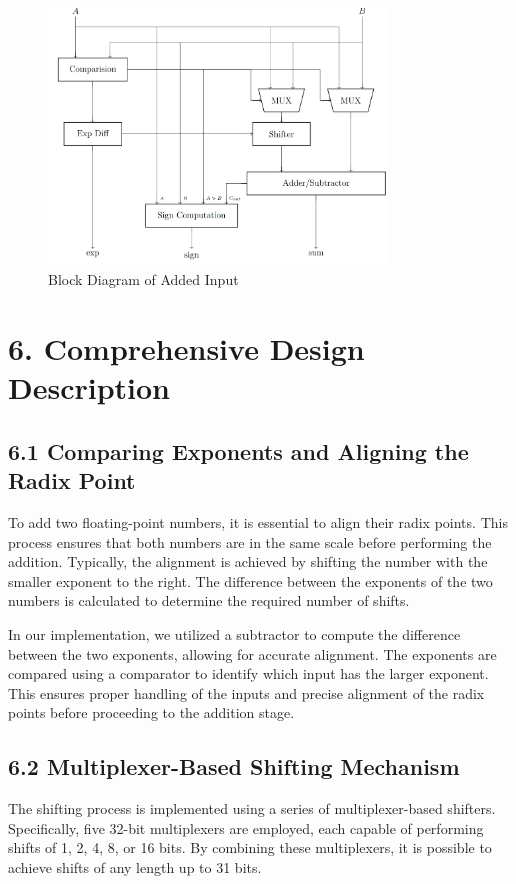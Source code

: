 \documentclass{article}
\begin{document}
\begin{figure}[H]
    \centering
    \includegraphics[width=0.8\textwidth]{blockadder.png} %
    \caption{Block Diagram of Added Input}
    \label{fig:Output Processor of the Resul}
\end{figure}



\section*{6. Comprehensive Design Description}

\subsection*{6.1 Comparing Exponents and Aligning the Radix Point}

To add two floating-point numbers, it is essential to align their radix points. This process ensures that both numbers are in the same scale before performing the addition. Typically, the alignment is achieved by shifting the number with the smaller exponent to the right. The difference between the exponents of the two numbers is calculated to determine the required number of shifts.

In our implementation, we utilized a subtractor to compute the difference between the two exponents, allowing for accurate alignment. The exponents are compared using a comparator to identify which input has the larger exponent. This ensures proper handling of the inputs and precise alignment of the radix points before proceeding to the addition stage.

\subsection*{6.2 Multiplexer-Based Shifting Mechanism}
The shifting process is implemented using a series of multiplexer-based shifters. Specifically, five 32-bit multiplexers are employed, each capable of performing shifts of 1, 2, 4, 8, or 16 bits. By combining these multiplexers, it is possible to achieve shifts of any length up to 31 bits. 
\end{document}
